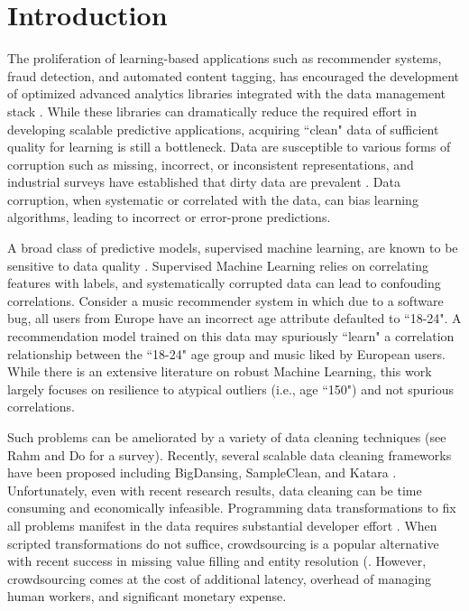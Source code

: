 \section{Introduction}
The proliferation of learning-based applications such as recommender systems, fraud detection, and automated content tagging, has encouraged the development of optimized advanced analytics libraries integrated with the data management stack \cite{bdas, alexandrov2014stratosphere, crotty2014tupleware, hellerstein2012madlib}. 
While these libraries can dramatically reduce the required effort in developing scalable predictive applications, acquiring ``clean" data of sufficient quality for learning is still a bottleneck.
Data are susceptible to various forms of corruption such as missing, incorrect, or inconsistent representations, and industrial surveys have established that dirty data are prevalent  \cite{Gartner}.
Data corruption, when systematic or correlated with the data\cite{taylor1982introduction}, can bias learning algorithms, leading to incorrect or error-prone predictions.

A broad class of predictive models, supervised machine learning, are known to be sensitive to data quality \cite{xiaofeature}.
Supervised Machine Learning relies on correlating features with labels, and systematically corrupted data can lead to confouding correlations.
Consider a music recommender system in which due to a software bug, all users from Europe have an incorrect age attribute defaulted to ``18-24".
A recommendation model trained on this data may spuriously ``learn" a correlation relationship between the ``18-24" age group and music liked by European users.
While there is an extensive literature on robust Machine Learning, this work largely focuses on resilience to atypical outliers (i.e., age ``150") and not spurious correlations.

Such problems can be ameliorated by a variety of data cleaning techniques (see Rahm and Do \cite{rahm2000data} for a survey).
Recently, several scalable data cleaning frameworks have been proposed including BigDansing\cite{khayyat2015bigdansing}, SampleClean\cite{sampleclean}, and Katara \cite{chu2015katara}. 
Unfortunately, even with recent research results, data cleaning can be time consuming and economically infeasible\cite{wang1999sample}.
Programming data transformations to fix all problems manifest in the data requires substantial developer effort \cite{kandel2012}.
When scripted transformations do not suffice, crowdsourcing is a popular alternative with recent success in missing value filling and entity resolution (\cite{gokhale2014corleone, park2014crowdfill, sampleclean,chu2015katara}.
However, crowdsourcing comes at the cost of additional latency, overhead of managing human workers, and significant monetary expense.

